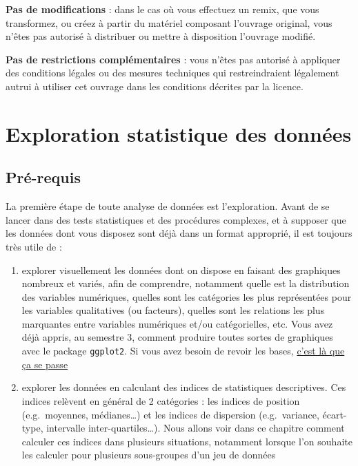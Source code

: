 \documentclass[
  a4paper,
  DIV=11,
  numbers=noendperiod,
  oneside]{scrreprt}
\begin{document}
{} \textbf{Pas de modifications} : dans le
cas où vous effectuez un remix, que vous transformez, ou créez à partir
du matériel composant l'ouvrage original, vous n'êtes pas autorisé à
distribuer ou mettre à disposition l'ouvrage modifié.

{} \textbf{Pas de restrictions complémentaires} :
vous n'êtes pas autorisé à appliquer des conditions légales ou des
mesures techniques qui restreindraient légalement autrui à utiliser cet
ouvrage dans les conditions décrites par la licence.


\hypertarget{sec-EDA}{%
\chapter{Exploration statistique des données}\label{sec-EDA}}

\hypertarget{pruxe9-requis-1}{%
\section{Pré-requis}\label{pruxe9-requis-1}}

La première étape de toute analyse de données est l'exploration. Avant
de se lancer dans des tests statistiques et des procédures complexes, et
à supposer que les données dont vous disposez sont déjà dans un format
approprié, il est toujours très utile de :

\begin{enumerate}
\def\labelenumi{\arabic{enumi}.}
\item
  explorer visuellement les données dont on dispose en faisant des
  graphiques nombreux et variés, afin de comprendre, notamment quelle
  est la distribution des variables numériques, quelles sont les
  catégories les plus représentées pour les variables qualitatives (ou
  facteurs), quelles sont les relations les plus marquantes entre
  variables numériques et/ou catégorielles, etc. Vous avez déjà appris,
  au semestre 3, comment produire toutes sortes de graphiques avec le
  package \texttt{ggplot2}. Si vous avez besoin de revoir les bases,
  \href{https://besibo.github.io/BiometrieS3/03-visualization.html}{c'est
  là que ça se passe}
\item
  explorer les données en calculant des indices de statistiques
  descriptives. Ces indices relèvent en général de 2 catégories : les
  indices de position (e.g.~moyennes, médianes\ldots) et les indices de
  dispersion (e.g.~variance, écart-type, intervalle
  inter-quartiles\ldots). Nous allons voir dans ce chapitre comment
  calculer ces indices dans plusieurs situations, notamment lorsque l'on
  souhaite les calculer pour plusieurs sous-groupes d'un jeu de données
\end{enumerate}
\end{document}
